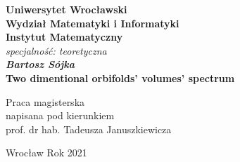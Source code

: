 \newpage
\thispagestyle{empty}
\begin{center}
\textbf{\large Uniwersytet Wrocławski\\
Wydział Matematyki i Informatyki\\
Instytut Matematyczny}\\
\textit{\large specjalność: teoretyczna}\\
\vspace{4cm}
\textbf{\textit{\large Bartosz Sójka}\\
\vspace{0.5cm}
{\Large Two dimentional orbifolds' volumes' spectrum}}\\
\end{center}
\vspace{3cm}
{\large \hspace*{6.5cm}Praca magisterska\\
\hspace*{6.5cm}napisana pod kierunkiem\\
\hspace*{6.5cm}prof. dr hab. Tadeusza Januszkiewicza }\\
\vfill
\begin{center}
{\large Wrocław Rok 2021}\\
\end{center}
